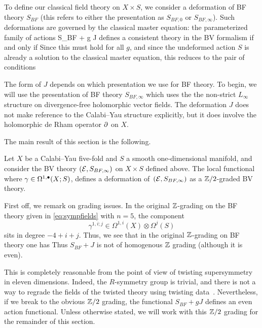 \parsec

To define our classical field theory on $X \times S$, we consider  a deformation of BF theory $S_{BF}$ (this refers to either the presentation as $S_{BF,0}$ or $S_{BF,\infty}$). 
Such deformations are governed by the classical master equation: the parameterized family of actions 
\beqn\label{eqn:defaction}
S_{BF} + g J
\eeqn
defines a consistent theory in the BV formalism if and only if
Since this must hold for all $g$, and since the undeformed action $S$ is already a solution to the classical master equation, this reduces to the pair of conditions

The form of $J$ depends on which presentation we use for BF theory.
To begin, we will use the presentation of BF theory $S_{BF, \infty}$ which uses the the non-strict $L_\infty$ structure on divergence-free holomorphic vector fields.
The deformation $J$ does not make reference to the Calabi--Yau structure explicitly, but it does involve the holomorphic de Rham operator $\partial$ on $X$. 

The main result of this section is the following. 

\begin{thm}
\label{thm:dfn}
Let $X$ be a Calabi--Yau five-fold and $S$ a smooth one-dimensional manifold, and consider the BV theory $(\mathcal E, S_{BF,\infty})$ on $X \times S$ defined above. The local functional 
  where $\gamma \in \Omega^{1,\bullet}(X;S)$, defines a deformation of~$(\mathcal E,S_{BF,\infty})$ as a $\mathbb{Z}/2$-graded BV theory.
\end{thm}

\parsec[]

First off, we remark on grading issues. 
In the original $\mathbb{Z}$-grading on the BF theory given in \eqref{eq:sympfields} with $n=5$, the component 
\[
\gamma^{1,i;j} \in \Omega^{1,i}(X) \otimes \Omega^j(S) 
\]
sits in degree $-4+i+j$. 
Thus, we see that in the original $\mathbb{Z}$-grading on BF theory one has
Thus $S_{BF} + J$ is not of homogenous $\mathbb Z$ grading (although it is even).

This is completely reasonable from the point of view of twisting supersymmetry in eleven dimensions. 
Indeed, the $R$-symmetry group is trivial, and there is not a way to regrade the fields of the twisted theory using twisting data~\label{CosHol,ESW}. 
Nevertheless, if we break to the obvious $\mathbb Z/2$ grading, the functional $S_{BF} + g J$ defines an even action functional.
Unless otherwise stated, we will work with this $\mathbb Z/2$ grading for the remainder of this section.

